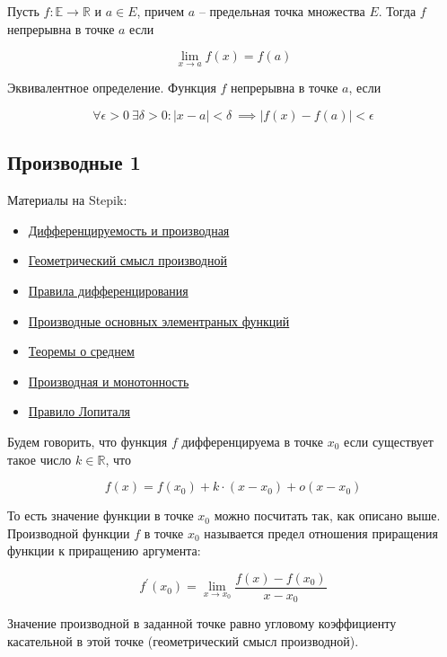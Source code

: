 \documentclass{article}
\begin{document}
Пусть $f : \mathbb{E} \to \mathbb{R}$ и $a \in E$, причем $a$ -- предельная точка множества $E$. Тогда $f$ непрерывна в точке $a$ если

$$ \lim\limits_{x \to a} f(x) = f(a) $$

Эквивалентное определение. Функция $f$ непрерывна в точке $a$, если

$$ \forall \epsilon > 0 \ \exists \delta > 0 : |x - a| < \delta \ \implies |f(x) - f(a)| < \epsilon $$

\subsection{Производные 1}

Материалы на Stepik:

\begin{itemize}
	\item \href{https://stepik.org/lesson/28380/step/1}{Дифференцируемость и производная}
	\item \href{https://stepik.org/lesson/28380/step/4}{Геометрический смысл производной}
	\item \href{https://stepik.org/lesson/28380/step/6}{Правила дифференцирования}
	\item \href{https://stepik.org/lesson/28380/step/8}{Производные основных элементраных функций}
	\item \href{https://stepik.org/lesson/28369/step/2}{Теоремы о среднем}
	\item \href{https://stepik.org/lesson/28370/step/1}{Производная и монотонность}
	\item \href{https://stepik.org/lesson/28381/step/1}{Правило Лопиталя}
\end{itemize}

Будем говорить, что функция $f$ дифференцируема в точке $x_0$ если существует такое число $k \in \mathbb{R}$, что

$$ f(x) = f(x_0) + k \cdot (x - x_0) + o(x - x_0) $$

То есть значение функции в точке $x_0$ можно посчитать так, как описано выше. \\

Производной функции $f$ в точке $x_0$ называется предел отношения приращения функции к приращению аргумента:

$$ f^{\prime}(x_0) = \lim\limits_{x \to x_0} \frac{f(x) - f(x_0)}{x - x_0} $$

Значение производной в заданной точке равно угловому коэффициенту касательной в этой точке (геометрический смысл производной). \\
\end{document}
